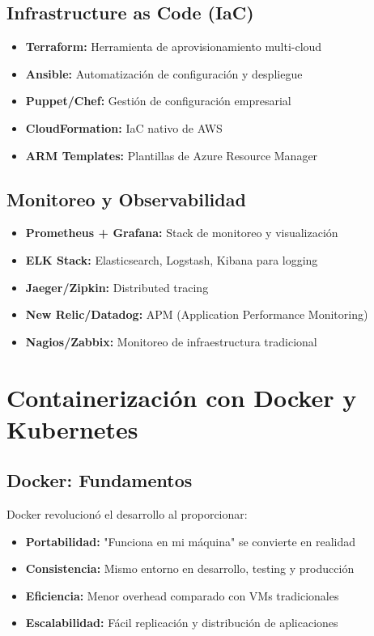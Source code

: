 \documentclass[12pt,a4paper]{article}
\begin{document}
\subsection{Infrastructure as Code (IaC)}
\begin{itemize}
    \item \textbf{Terraform:} Herramienta de aprovisionamiento multi-cloud
    \item \textbf{Ansible:} Automatización de configuración y despliegue
    \item \textbf{Puppet/Chef:} Gestión de configuración empresarial
    \item \textbf{CloudFormation:} IaC nativo de AWS
    \item \textbf{ARM Templates:} Plantillas de Azure Resource Manager
\end{itemize}

\subsection{Monitoreo y Observabilidad}
\begin{itemize}
    \item \textbf{Prometheus + Grafana:} Stack de monitoreo y visualización
    \item \textbf{ELK Stack:} Elasticsearch, Logstash, Kibana para logging
    \item \textbf{Jaeger/Zipkin:} Distributed tracing
    \item \textbf{New Relic/Datadog:} APM (Application Performance Monitoring)
    \item \textbf{Nagios/Zabbix:} Monitoreo de infraestructura tradicional
\end{itemize}

\section{Containerización con Docker y Kubernetes}

\subsection{Docker: Fundamentos}
Docker revolucionó el desarrollo al proporcionar:
\begin{itemize}
    \item \textbf{Portabilidad:} "Funciona en mi máquina" se convierte en realidad
    \item \textbf{Consistencia:} Mismo entorno en desarrollo, testing y producción
    \item \textbf{Eficiencia:} Menor overhead comparado con VMs tradicionales
    \item \textbf{Escalabilidad:} Fácil replicación y distribución de aplicaciones
\end{itemize}
\end{document}

